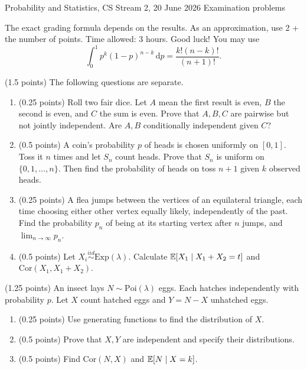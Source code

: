 \documentclass[a4paper]{report}
\begin{document}
\noindent Probability and Statistics, CS Stream 2, 20 June 2026 \hfill Examination problems
\hrulefill
\begin{it}The exact grading formula depends on the results. As an approximation, use 2 + the number of points. Time allowed: 3 hours. Good luck! You may use
\[\int_0^1p^k(1-p)^{n-k}\,\mathrm dp=\frac{k!(n-k)!}{(n+1)!}.\]
\end{it}
\begin{problem} (1.5 points) The following questions are separate.
\begin{enumerate}
\item (0.25 points) Roll two fair dice. Let $A$ mean the first result is even, $B$ the second is even, and $C$ the sum is even. Prove that $A,B,C$ are pairwise but not jointly independent. Are $A,B$ conditionally independent given $C$?
\item (0.5 points) A coin's probability $p$ of heads is chosen uniformly on $[0,1]$. Toss it $n$ times and let $S_n$ count heads. Prove that $S_n$ is uniform on $\{0,1,\ldots,n\}$. Then find the probability of heads on toss $n+1$ given $k$ observed heads.
\item (0.25 points) A flea jumps between the vertices of an equilateral triangle, each time choosing either other vertex equally likely, independently of the past. Find the probability $p_n$ of being at its starting vertex after $n$ jumps, and $\lim_{n\to\infty}p_n$.
\item (0.5 points) Let $X_i\overset{iid}{\sim}\mathrm{Exp}(\lambda)$. Calculate $\mathbb {E}[X_1\mid X_1+X_2=t]$ and $\mathrm{Cor}(X_1,X_1+X_2)$.
\end{enumerate}
\end{problem}
\begin{problem} (1.25 points)
An insect lays $N\sim\mathrm{Poi}(\lambda)$ eggs. Each hatches independently with probability $p$. Let $X$ count hatched eggs and $Y=N-X$ unhatched eggs.
\begin{enumerate}
\item (0.25 points) Use generating functions to find the distribution of $X$.
\item (0.5 points) Prove that $X,Y$ are independent and specify their distributions.
\item (0.5 points) Find $\mathrm{Cor}(N,X)$ and $\mathbb {E}[N\mid X=k]$.
\end{enumerate}
\end{problem}
\end{document}
